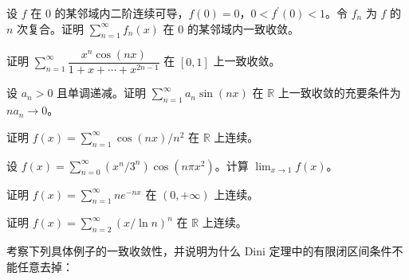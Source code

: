 \noindent\begin{minipage}{\textwidth}
设 $f$ 在 $0$ 的某邻域内二阶连续可导，$f(0)=0$，$0<f^{\prime}(0)<1$。令 $f_n$ 为 $f$ 的 $n$ 次复合。证明 $\sum_{n=1}^{\infty}f_n(x)$ 在 $0$ 的某邻域内一致收敛。
\end{minipage}\par\vfill
\noindent\begin{minipage}{\textwidth}
证明 $\sum_{n=1}^{\infty}\dfrac{x^n\cos(nx)}{1+x+\cdots+x^{2n-1}}$ 在 $[0,1]$ 上一致收敛。
\end{minipage}\par\vfill
\newpage
\noindent\begin{minipage}{\textwidth}
设 $a_n>0$ 且单调递减。证明 $\sum_{n=1}^{\infty}a_n\sin(nx)$ 在 $\mathbb R$ 上一致收敛的充要条件为 $na_n\to0$。
\end{minipage}\par\vfill
\noindent\begin{minipage}{\textwidth}
证明 $f(x)=\sum_{n=1}^{\infty}\cos(nx)/n^2$ 在 $\mathbb R$ 上连续。
\end{minipage}\par\vfill
\noindent\begin{minipage}{\textwidth}
设 $f(x)=\sum_{n=0}^{\infty}(x^n/3^n)\cos(n\pi x^2)$。计算 $\lim_{x\to1}f(x)$。
\end{minipage}\par\vfill
\newpage
\noindent\begin{minipage}{\textwidth}
证明 $f(x)=\sum_{n=1}^{\infty}ne^{-nx}$ 在 $(0,+\infty)$ 上连续。
\end{minipage}\par\vfill
\noindent\begin{minipage}{\textwidth}
证明 $f(x)=\sum_{n=2}^{\infty}(x/\ln n)^n$ 在 $\mathbb R$ 上连续。
\end{minipage}\par\vfill
\noindent\begin{minipage}{\textwidth}
考察下列具体例子的一致收敛性，并说明为什么 Dini 定理中的有限闭区间条件不能任意去掉：
\SubQ{2}{函数项级数 $\sum_{n=0}^{\infty}x^n$，$x\in[0,1)$。}
\SubQ{3}{函数项级数 $\sum_{n=2}^{\infty}(x/\ln n)^n$，$x\in[0,+\infty)$。}
\end{minipage}\par\vfill
